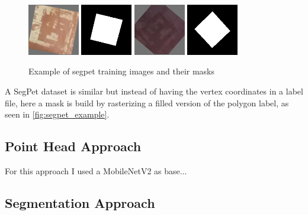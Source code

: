 \documentclass[10pt]{book}
\begin{document}
\begin{figure}
  \centering
     {\includegraphics[width=0.2\textwidth]{image/segpet_example_in}}
     {\includegraphics[width=0.2\textwidth]{image/segpet_example_seg}}
     {\includegraphics[width=0.2\textwidth]{image/segpet_example_2_in}}
     {\includegraphics[width=0.2\textwidth]{image/segpet_example_2_seg}}
  \caption{Example of segpet training images and their masks}
  \label{fig:segpet_example}
\end{figure}

A SegPet dataset is similar but instead of having the vertex coordinates in a label file, here a mask is build by rasterizing a filled version of the polygon label, as seen in \autoref{fig:segpet_example}.

\subsection{Point Head Approach}

For this approach I used a MobileNetV2 as base...

\subsection{Segmentation Approach}
\end{document}
